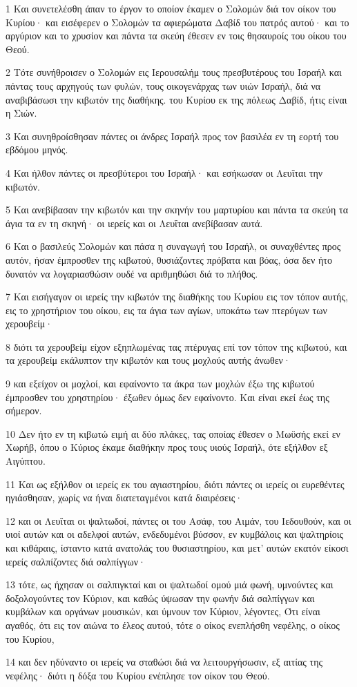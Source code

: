 \par 1 Και συνετελέσθη άπαν το έργον το οποίον έκαμεν ο Σολομών διά τον οίκον του Κυρίου· και εισέφερεν ο Σολομών τα αφιερώματα Δαβίδ του πατρός αυτού· και το αργύριον και το χρυσίον και πάντα τα σκεύη έθεσεν εν τοις θησαυροίς του οίκου του Θεού.
\par 2 Τότε συνήθροισεν ο Σολομών εις Ιερουσαλήμ τους πρεσβυτέρους του Ισραήλ και πάντας τους αρχηγούς των φυλών, τους οικογενάρχας των υιών Ισραήλ, διά να αναβιβάσωσι την κιβωτόν της διαθήκης. του Κυρίου εκ της πόλεως Δαβίδ, ήτις είναι η Σιών.
\par 3 Και συνηθροίσθησαν πάντες οι άνδρες Ισραήλ προς τον βασιλέα εν τη εορτή του εβδόμου μηνός.
\par 4 Και ήλθον πάντες οι πρεσβύτεροι του Ισραήλ· και εσήκωσαν οι Λευΐται την κιβωτόν.
\par 5 Και ανεβίβασαν την κιβωτόν και την σκηνήν του μαρτυρίου και πάντα τα σκεύη τα άγια τα εν τη σκηνή· οι ιερείς και οι Λευΐται ανεβίβασαν αυτά.
\par 6 Και ο βασιλεύς Σολομών και πάσα η συναγωγή του Ισραήλ, οι συναχθέντες προς αυτόν, ήσαν έμπροσθεν της κιβωτού, θυσιάζοντες πρόβατα και βόας, όσα δεν ήτο δυνατόν να λογαριασθώσιν ουδέ να αριθμηθώσι διά το πλήθος.
\par 7 Και εισήγαγον οι ιερείς την κιβωτόν της διαθήκης του Κυρίου εις τον τόπον αυτής, εις το χρηστήριον του οίκου, εις τα άγια των αγίων, υποκάτω των πτερύγων των χερουβείμ·
\par 8 διότι τα χερουβείμ είχον εξηπλωμένας τας πτέρυγας επί τον τόπον της κιβωτού, και τα χερουβείμ εκάλυπτον την κιβωτόν και τους μοχλούς αυτής άνωθεν·
\par 9 και εξείχον οι μοχλοί, και εφαίνοντο τα άκρα των μοχλών έξω της κιβωτού έμπροσθεν του χρηστηρίου· έξωθεν όμως δεν εφαίνοντο. Και είναι εκεί έως της σήμερον.
\par 10 Δεν ήτο εν τη κιβωτώ ειμή αι δύο πλάκες, τας οποίας έθεσεν ο Μωϋσής εκεί εν Χωρήβ, όπου ο Κύριος έκαμε διαθήκην προς τους υιούς Ισραήλ, ότε εξήλθον εξ Αιγύπτου.
\par 11 Και ως εξήλθον οι ιερείς εκ του αγιαστηρίου, διότι πάντες οι ιερείς οι ευρεθέντες ηγιάσθησαν, χωρίς να ήναι διατεταγμένοι κατά διαιρέσεις·
\par 12 και οι Λευΐται οι ψαλτωδοί, πάντες οι του Ασάφ, του Αιμάν, του Ιεδουθούν, και οι υιοί αυτών και οι αδελφοί αυτών, ενδεδυμένοι βύσσον, εν κυμβάλοις και ψαλτηρίοις και κιθάραις, ίσταντο κατά ανατολάς του θυσιαστηρίου, και μετ' αυτών εκατόν είκοσι ιερείς σαλπίζοντες διά σαλπίγγων·
\par 13 τότε, ως ήχησαν οι σαλπιγκταί και οι ψαλτωδοί ομού μιά φωνή, υμνούντες και δοξολογούντες τον Κύριον, και καθώς ύψωσαν την φωνήν διά σαλπίγγων και κυμβάλων και οργάνων μουσικών, και ύμνουν τον Κύριον, λέγοντες, Ότι είναι αγαθός, ότι εις τον αιώνα το έλεος αυτού, τότε ο οίκος ενεπλήσθη νεφέλης, ο οίκος του Κυρίου,
\par 14 και δεν ηδύναντο οι ιερείς να σταθώσι διά να λειτουργήσωσιν, εξ αιτίας της νεφέλης· διότι η δόξα του Κυρίου ενέπλησε τον οίκον του Θεού.

